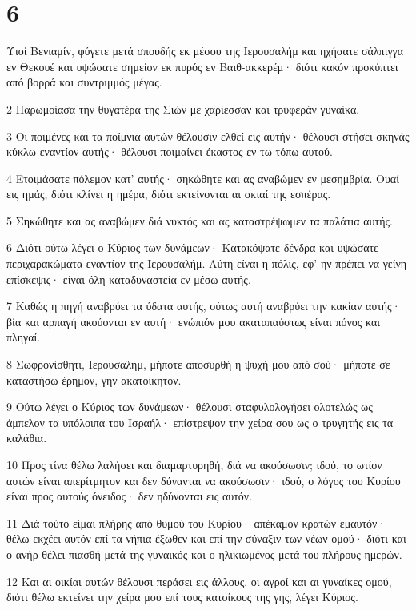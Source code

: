\chapter{6}

\par Υιοί Βενιαμίν, φύγετε μετά σπουδής εκ μέσου της Ιερουσαλήμ και ηχήσατε σάλπιγγα εν Θεκουέ και υψώσατε σημείον εκ πυρός εν Βαιθ-ακκερέμ· διότι κακόν προκύπτει από βορρά και συντριμμός μέγας.
\par 2 Παρωμοίασα την θυγατέρα της Σιών με χαρίεσσαν και τρυφεράν γυναίκα.
\par 3 Οι ποιμένες και τα ποίμνια αυτών θέλουσιν ελθεί εις αυτήν· θέλουσι στήσει σκηνάς κύκλω εναντίον αυτής· θέλουσι ποιμαίνει έκαστος εν τω τόπω αυτού.
\par 4 Ετοιμάσατε πόλεμον κατ' αυτής· σηκώθητε και ας αναβώμεν εν μεσημβρία. Ουαί εις ημάς, διότι κλίνει η ημέρα, διότι εκτείνονται αι σκιαί της εσπέρας.
\par 5 Σηκώθητε και ας αναβώμεν διά νυκτός και ας καταστρέψωμεν τα παλάτια αυτής.
\par 6 Διότι ούτω λέγει ο Κύριος των δυνάμεων· Κατακόψατε δένδρα και υψώσατε περιχαρακώματα εναντίον της Ιερουσαλήμ. Αύτη είναι η πόλις, εφ' ην πρέπει να γείνη επίσκεψις· είναι όλη καταδυναστεία εν μέσω αυτής.
\par 7 Καθώς η πηγή αναβρύει τα ύδατα αυτής, ούτως αυτή αναβρύει την κακίαν αυτής· βία και αρπαγή ακούονται εν αυτή· ενώπιόν μου ακαταπαύστως είναι πόνος και πληγαί.
\par 8 Σωφρονίσθητι, Ιερουσαλήμ, μήποτε αποσυρθή η ψυχή μου από σού· μήποτε σε καταστήσω έρημον, γην ακατοίκητον.
\par 9 Ούτω λέγει ο Κύριος των δυνάμεων· θέλουσι σταφυλολογήσει ολοτελώς ως άμπελον τα υπόλοιπα του Ισραήλ· επίστρεψον την χείρα σου ως ο τρυγητής εις τα καλάθια.
\par 10 Προς τίνα θέλω λαλήσει και διαμαρτυρηθή, διά να ακούσωσιν; ιδού, το ωτίον αυτών είναι απερίτμητον και δεν δύνανται να ακούσωσιν· ιδού, ο λόγος του Κυρίου είναι προς αυτούς όνειδος· δεν ηδύνονται εις αυτόν.
\par 11 Διά τούτο είμαι πλήρης από θυμού του Κυρίου· απέκαμον κρατών εμαυτόν· θέλω εκχέει αυτόν επί τα νήπια έξωθεν και επί την σύναξιν των νέων ομού· διότι και ο ανήρ θέλει πιασθή μετά της γυναικός και ο ηλικιωμένος μετά του πλήρους ημερών.
\par 12 Και αι οικίαι αυτών θέλουσι περάσει εις άλλους, οι αγροί και αι γυναίκες ομού, διότι θέλω εκτείνει την χείρα μου επί τους κατοίκους της γης, λέγει Κύριος.
